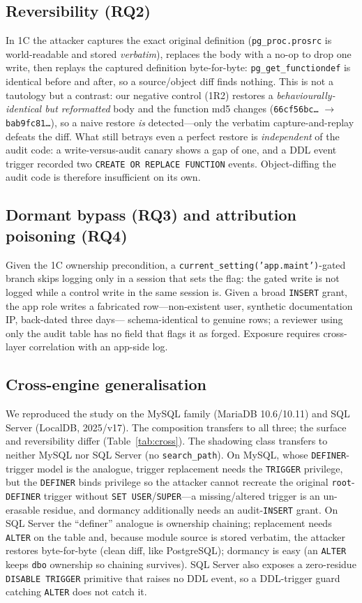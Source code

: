 \documentclass[11pt]{article}
\newcommand{\code}[1]{\texttt{#1}}
\begin{document}
\subsection{Reversibility (RQ2)}
In 1C the attacker captures the exact original definition (\code{pg\_proc.prosrc} is
world-readable and stored \emph{verbatim}), replaces the body with a no-op to drop one
write, then replays the captured definition byte-for-byte: \code{pg\_get\_functiondef} is
identical before and after, so a source/object diff finds nothing. This is not a tautology
but a contrast: our negative control (1R2) restores a \emph{behaviourally-identical but
reformatted} body and the function md5 changes (\texttt{66cf56bc\ldots} $\rightarrow$
\texttt{bab9fc81\ldots}), so a naive restore \emph{is} detected---only the verbatim
capture-and-replay defeats the diff. What still betrays even a perfect restore is
\emph{independent} of the audit code: a write-versus-audit canary shows a gap of one, and a
DDL event trigger recorded two \code{CREATE OR REPLACE FUNCTION} events. Object-diffing the
audit code is therefore insufficient on its own.

\subsection{Dormant bypass (RQ3) and attribution poisoning (RQ4)}
Given the 1C ownership precondition, a \code{current\_setting('app.maint')}-gated branch
skips logging only in a session that sets the flag: the gated write is not logged while a
control write in the same session is. Given a broad \code{INSERT} grant, the app role writes
a fabricated row---non-existent user, synthetic documentation IP, back-dated three days---%
schema-identical to genuine rows; a reviewer using only the audit table has no field that
flags it as forged. Exposure requires cross-layer correlation with an app-side log.

\subsection{Cross-engine generalisation}
We reproduced the study on the MySQL family (MariaDB 10.6/10.11) and SQL Server
(LocalDB, 2025/v17). The composition transfers to all three; the surface and reversibility
differ (Table~\ref{tab:cross}). The shadowing class transfers to neither MySQL nor SQL
Server (no \code{search\_path}). On MySQL, whose \code{DEFINER}-trigger model is the
analogue, trigger replacement needs the \code{TRIGGER} privilege, but the \code{DEFINER}
binds privilege so the attacker cannot recreate the original \code{root}-\code{DEFINER}
trigger without \code{SET USER}/\code{SUPER}---a missing/altered trigger is an un-erasable
residue, and dormancy additionally needs an audit-\code{INSERT} grant. On SQL Server the
``definer'' analogue is ownership chaining; replacement needs \code{ALTER} on the table and,
because module source is stored verbatim, the attacker restores byte-for-byte (clean diff,
like PostgreSQL); dormancy is easy (an \code{ALTER} keeps \code{dbo} ownership so chaining
survives). SQL Server also exposes a zero-residue \code{DISABLE TRIGGER} primitive that
raises no DDL event, so a DDL-trigger guard catching \code{ALTER} does not catch it.
\end{document}
